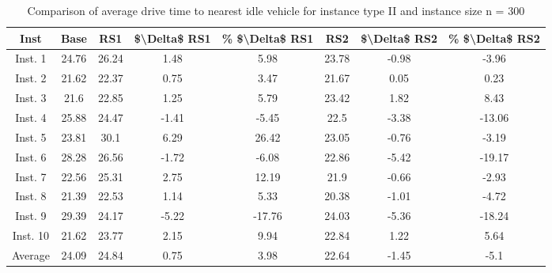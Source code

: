 \begin{table}[H]
\centering
\begin{tabular}{cccccccc}
  \hline
  \textbf{Inst} & \textbf{Base} & \textbf{RS1} & \textbf{\$\textbackslash{}Delta\$  RS1} & \textbf{\% \$\textbackslash{}Delta\$  RS1} & \textbf{RS2} & \textbf{\$\textbackslash{}Delta\$  RS2} & \textbf{\% \$\textbackslash{}Delta\$  RS2} \\\hline
  Inst. 1 & 24.76 & 26.24 & 1.48 & 5.98 & 23.78 & -0.98 & -3.96 \\
  Inst. 2 & 21.62 & 22.37 & 0.75 & 3.47 & 21.67 & 0.05 & 0.23 \\
  Inst. 3 & 21.6 & 22.85 & 1.25 & 5.79 & 23.42 & 1.82 & 8.43 \\
  Inst. 4 & 25.88 & 24.47 & -1.41 & -5.45 & 22.5 & -3.38 & -13.06 \\
  Inst. 5 & 23.81 & 30.1 & 6.29 & 26.42 & 23.05 & -0.76 & -3.19 \\
  Inst. 6 & 28.28 & 26.56 & -1.72 & -6.08 & 22.86 & -5.42 & -19.17 \\
  Inst. 7 & 22.56 & 25.31 & 2.75 & 12.19 & 21.9 & -0.66 & -2.93 \\
  Inst. 8 & 21.39 & 22.53 & 1.14 & 5.33 & 20.38 & -1.01 & -4.72 \\
  Inst. 9 & 29.39 & 24.17 & -5.22 & -17.76 & 24.03 & -5.36 & -18.24 \\
  Inst. 10 & 21.62 & 23.77 & 2.15 & 9.94 & 22.84 & 1.22 & 5.64 \\
  Average & 24.09 & 24.84 & 0.75 & 3.98 & 22.64 & -1.45 & -5.1 \\\hline
\end{tabular}
\caption{Comparison of average drive time to nearest idle vehicle for instance type II and instance size n = 300}
\label{tab:wait:resrelocation-nearest-drive-time-comparison_II_300}
\end{table}
